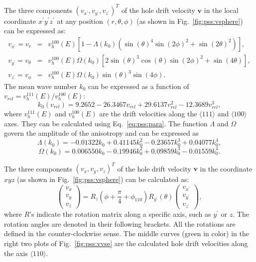 The three components $(v_{x^{\prime}}, v_{y^{\prime}}, v_{z^{\prime}})^{T}$ of the hole drift velocity $\mathbf{v}$ in the local coordinate $x^{\prime}y^{\prime}z^{\prime}$ at any position $(r, \theta, \phi)$ (as shown in Fig.~\ref{fig:pss:vsphere}) can be expressed as:
\begin{equation}
\label{eq:pss:vsphere}
\begin{array}{rcl}
v_{x^{\prime}} = v_{r} &=& v^{100}_{h}(E)[1-\Lambda(k_{0})(\sin(\theta)^{4}\sin(2\phi)^{2} + \sin(2\theta)^{2})],\\
v_{y^{\prime}} = v_{\theta} &=& v^{100}_{h}(E)\Omega(k_{0})[2\sin(\theta)^{3}\cos(\theta)\sin(2\phi)^{2} + \sin(4\theta)],\\
v_{z^{\prime}} = v_{\phi} &=& v^{100}_{h}(E)\Omega(k_{0})\sin(\theta)^{3}\sin(4\phi).
\end{array}
\end{equation}
The mean wave number $k_{0}$ can be expressed as a function of $v_{rel} = v^{111}_{h}(E)/v^{100}_{h}(E)$:
\begin{equation}
\label{eq:pss:k0}
k_{0}(v_{rel}) = 9.2652 - 26.3467v_{rel} + 29.6137v_{rel}^{2} - 12.3689v_{rel}^{3},
\end{equation}
where $v^{111}_{h}(E)$ and $v^{100}_{h}(E)$ are the drift velocities along the $\langle111\rangle$ and $\langle100\rangle$ axes. They can be calculated using Eq.~\ref{eq:pss:para}. The function $\Lambda$ and $\Omega$ govern the amplitude of the anisotropy and can be expressed as
\begin{equation}
\label{eq:pss:lamb}
\Lambda(k_{0}) = -0.01322k_{0} + 0.41145k_{0}^{2} - 0.23657k_{0}^{3} + 0.04077k_{0}^{4},
\end{equation}
\begin{equation}
\label{eq:pss:ome}
\Omega(k_{0}) = 0.006550k_{0} - 0.19946k_{0}^{2} + 0.09859k_{0}^{3} - 0.01559k_{0}^{4}.
\end{equation}

The three components $(v_{x}, v_{y}, v_{z})^{T}$ of the hole drift velocity $\mathbf{v}$ in the coordinate $xyz$ (as shown in Fig.~\ref{fig:pss:vsphere}) can be calculated as:
\begin{equation}
\label{eq:pss:v2v}  
\left(
\begin{array}{c}
v_{x} \\ v_{y} \\ v_{z}
\end{array}
\right) = R_{z}(\phi + \frac{\pi}{4} + \phi_{110}) R_{y^{\prime}}(\theta) \left( 
\begin{array}{c}
v_{x^{\prime}} \\ v_{y^{\prime}} \\ v_{z^{\prime}}
\end{array} \right),
\end{equation}
where $R$'s indicate the rotation matrix along a specific axis, such as $y^{\prime}$ or $z$. The rotation angles are denoted in their following brackets. All the rotations are defined in the counter-clockwise sense. The middle curves (green in color) in the right two plots of Fig.~\ref{fig:pss:vvse} are the calculated hole drift velocities along the axis $\langle 110 \rangle$.


